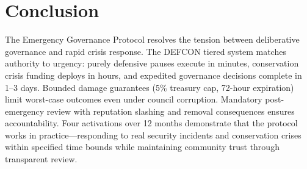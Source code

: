 \documentclass[11pt,letterpaper]{article}
\begin{document}
\section{Conclusion}
\label{sec:conclusion}

The Emergency Governance Protocol resolves the tension between deliberative governance and rapid crisis response. The DEFCON tiered system matches authority to urgency: purely defensive pauses execute in minutes, conservation crisis funding deploys in hours, and expedited governance decisions complete in 1--3 days. Bounded damage guarantees (5\% treasury cap, 72-hour expiration) limit worst-case outcomes even under council corruption. Mandatory post-emergency review with reputation slashing and removal consequences ensures accountability. Four activations over 12 months demonstrate that the protocol works in practice---responding to real security incidents and conservation crises within specified time bounds while maintaining community trust through transparent review.

\end{document}
